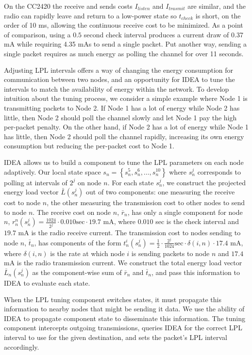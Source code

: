 On the CC2420 the receive and sends costs $I_{listen}$ and $I_{trasmit}$ are
similar, and the radio can rapidly leave and return to a low-power state so
$t_{check}$ is short, on the order of 10 ms, allowing the continuous receive
cost to be minimized. As a point of comparison, using a $0.5$ second check
interval produces a current draw of 0.37 mA while requiring 4.35 mAs to send
a single packet. Put another way, sending a single packet requires as much
energy as polling the channel for over 11 seconds.

Adjusting LPL intervals offers a way of changing the energy consumption for
communication between two nodes, and an opportunity for IDEA to tune the
intervals to match the availability of energy within the network. To develop
intuition about the tuning process, we consider a simple example where Node 1
is transmitting packets to Node 2. If Node 1 has a lot of energy while Node 2
has little, then Node 2 should poll the channel slowly and let Node 1 pay the
high per-packet penalty. On the other hand, if Node 2 has a lot of energy
while Node 1 has little, then Node 2 should poll the channel rapidly,
increasing its own energy consumption but reducing the per-packet cost to
Node 1.

IDEA allows us to build a component to tune the LPL parameters on each node
adaptively. Our local state space $s_n = \left\{s_n^5, s_n^6, \ldots,
s_n^{10} \right\}$ where $s_n^j$ corresponds to polling at intervals of $2^j$
on node $n$. For each state $s^j_n$, we construct the projected energy load
vector $\bar{L}(s^j_n)$ out of two components: one measuring the receive cost
to node $n$, the other measuring the transmission cost to other nodes to send
to node $n$. The receive cost on node $n$, $\bar{r}_n$, has only a single
component for node $n$, $r_n^n(s_n^j) = \frac{1024}{2^j} \cdot 0.010
\textrm{sec} \cdot 19.7$ mA, where $0.010$ sec is the check interval and
$19.7$ mA is the radio receive current. The transmission cost to nodes
sending to node $n$, $\bar{t}_n$, has components of the form $t^i_n(s_n^j) =
\frac{1}{2} \cdot \frac{2^j}{1024} \textrm{sec} \cdot \delta(i,n) \cdot 17.4$
mA, where $\delta(i,n)$ is the rate at which node $i$ is sending packets to
node $n$ and $17.4$ mA is the radio transmission current. We construct the
total energy load vector $\bar{L}_n(s^j_n)$ as the component-wise sum of
$\bar{r}_n$ and $\bar{t}_n$, and pass this information to IDEA to evaluate
each state.

When the LPL tuning component switches states, it must propagate this
information to nearby nodes that might be sending it data. We use the ability
of IDEA to propagate component state to disseminate this information. The
tuning component intercepts outgoing transmissions, queries IDEA for the
correct LPL interval to use for the given destination, and sets the packet's
LPL interval accordingly.

